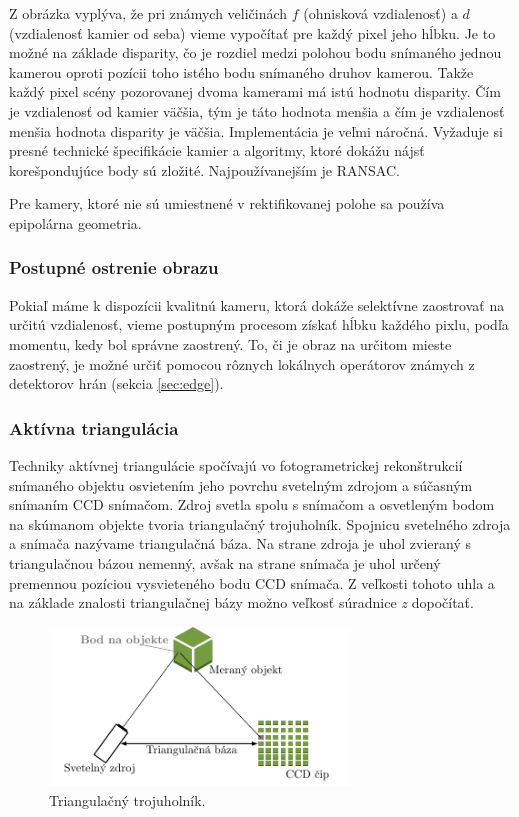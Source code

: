 Z obrázka vyplýva, že pri známych veličinách $f$ (ohnisková vzdialenosť) a $d$ (vzdialenosť kamier od seba) vieme vypočítať pre každý pixel jeho hĺbku. Je to možné na základe disparity, čo je rozdiel medzi polohou bodu snímaného jednou kamerou oproti pozícii toho istého bodu snímaného druhov kamerou. Takže každý pixel scény pozorovanej dvoma kamerami má istú hodnotu disparity. Čím je vzdialenosť od kamier väčšia, tým je táto hodnota menšia a čím je vzdialenosť menšia hodnota disparity je väčšia. Implementácia je veľmi náročná. Vyžaduje si presné technické špecifikácie kamier a algoritmy, ktoré dokážu nájsť korešpondujúce body sú zložité. Najpoužívanejším je RANSAC. \cite{pocitacove_videnie_v_praxi} 

Pre kamery, ktoré nie sú umiestnené v rektifikovanej  polohe sa používa epipolárna geometria. 

\subsubsection{Postupné ostrenie obrazu }
Pokiaľ máme k dispozícii kvalitnú kameru, ktorá dokáže selektívne zaostrovať na určitú vzdialenosť, vieme postupným procesom získať hĺbku každého pixlu, podľa momentu, kedy bol správne zaostrený. To, či je obraz na určitom mieste zaostrený, je možné určiť pomocou rôznych lokálnych operátorov známych z detektorov hrán (sekcia \ref{sec:edge}). \cite{pocitacove_videnie_v_praxi} 


\subsubsection{Aktívna triangulácia }
\label{sec:activeDeep}
Techniky aktívnej triangulácie spočívajú vo fotogrametrickej rekonštrukcií snímaného objektu osvietením jeho povrchu svetelným zdrojom a súčasným snímaním CCD snímačom. Zdroj svetla spolu s snímačom a osvetleným bodom na skúmanom objekte tvoria triangulačný trojuholník. Spojnicu svetelného zdroja a snímača nazývame triangulačná báza. Na strane zdroja je uhol zvieraný s triangulačnou bázou nemenný, avšak na strane snímača je uhol určený premennou pozíciou vysvieteného bodu CCD snímača. Z veľkosti tohoto uhla a na základe znalosti triangulačnej bázy možno veľkosť súradnice \textit{z} dopočítať. \cite{opticke_metody_merania}

 \begin{figure}[H]
\begin{center}
    \includegraphics[width=8cm]{images/activTriang}
    \caption{Triangulačný trojuholník.}
	\end{center}
\end{figure}


